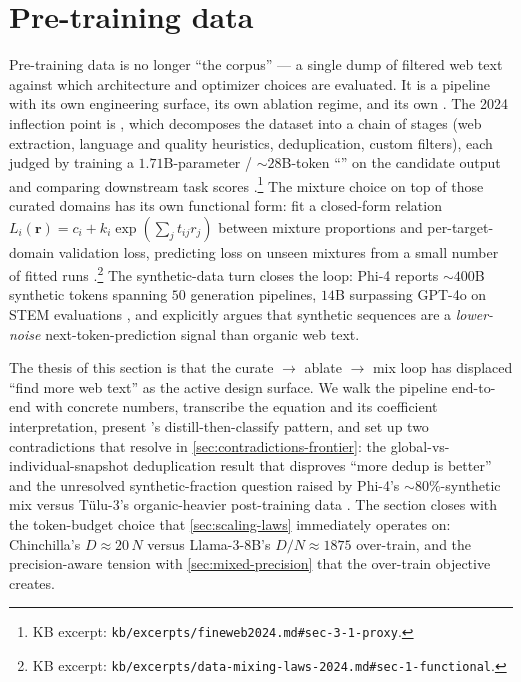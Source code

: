 
\section{Pre-training data}
\label{sec:pre-training-data}
\label{sec:pretrain-data}

Pre-training data is no longer ``the corpus'' --- a single dump of
filtered web text against which architecture and optimizer choices
are evaluated. It is a pipeline with its own engineering surface,
its own ablation regime, and its own . The 2024 inflection
point is  \citep{fineweb2024}, which decomposes the dataset
into a chain of stages (web extraction, language and quality
heuristics, deduplication, custom filters), each judged by training a
$1.71$B-parameter / $\sim 28$B-token ``'' on the
candidate output and comparing downstream task scores
\citep[\S 3.1]{fineweb2024}.\footnote{KB excerpt:
\texttt{kb/excerpts/fineweb2024.md\#sec-3-1-proxy}.} The mixture
choice on top of those curated domains has its own functional form:
\citet{data-mixing-laws-2024} fit a closed-form relation
$L_i(\mathbf{r}) = c_i + k_i \exp(\sum_j t_{ij} r_j)$ between
mixture proportions and per-target-domain validation loss, predicting
loss on unseen mixtures from a small number of fitted runs
\citep[\S 1, eq.\ 1]{data-mixing-laws-2024}.\footnote{KB excerpt:
\texttt{kb/excerpts/data-mixing-laws-2024.md\#sec-1-functional}.} The
synthetic-data turn closes the loop: Phi-4 \citep{phi4} reports
$\sim 400$B synthetic tokens spanning $50$ generation pipelines,
$14$B  surpassing GPT-4o on STEM evaluations
\citep[\S 1, Table 1]{phi4}, and explicitly argues that synthetic
sequences are a \emph{lower-noise} next-token-prediction signal than
organic web text.

The thesis of this section is that the curate $\to$ ablate $\to$ mix
loop has displaced ``find more web text'' as the active design
surface. We walk the  pipeline end-to-end with concrete
numbers, transcribe the  equation and its coefficient
interpretation, present 's distill-then-classify pattern,
and set up two contradictions that resolve in
\cref{sec:contradictions-frontier}: the global-vs-individual-snapshot
deduplication result that disproves ``more dedup is better''
\citep[\S 3.4]{fineweb2024} and the unresolved synthetic-fraction
question raised by Phi-4's $\sim\!80\%$-synthetic mix versus
Tülu-3's organic-heavier post-training data
\citep{tulu3}. The section closes with the token-budget choice that
\cref{sec:scaling-laws} immediately operates on: Chinchilla's
$D \approx 20\,N$ versus Llama-3-8B's $D / N \approx 1875$
over-train, and the precision-aware tension with \cref{sec:mixed-precision}
that the over-train objective creates.

